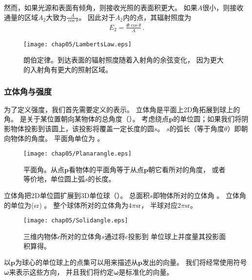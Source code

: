 然而，如果光源和表面有倾角，则接收光照的表面积更大。
如果$A$很小，则接收通量的区域$A_2$大致为$\displaystyle\frac{A}{\cos\theta}$。
因此对于$A_2$内的点，其辐射照度为
\begin{align*}
    E_2=\frac{\varPhi\cos\theta}{A}\, .
\end{align*}

\begin{figure}[htbp]
    \centering\texttt{[image: chap05/LambertsLaw.eps]}
    \caption{朗伯定律。到达表面的辐射照度随着入射角的余弦变化，
        因为更大的入射角有更大的照射区域。}
    \label{fig:5.7}
\end{figure}

\subsubsection*{立体角与强度}
为了定义强度，我们首先需要定义的表示。
立体角是平面上2D角拓展到球上的角。
是关于某位置朝向某物体的总角度（）。
考虑绕点$\bm p$的单位圆；如果我们将阴影物体投影到该圆上，该投影将覆盖一定长度的圆$s$。
$s$的弧长（等于角度$\theta$）即朝向物体的角度。
平面角单位为
。
\begin{figure}[htbp]
    \centering\texttt{[image: chap05/Planarangle.eps]}
    \caption{平面角。从点$\bm p$看物体的平面角等于从点$\bm p$朝它看所对的角度，
        或者等价地，单位圆上弧$s$的长度。}
    \label{fig:5.8}
\end{figure}

立体角把2D单位圆扩展到3D单位球（）。
总面积$s$即物体所对的立体角
。
立体角的单位为(sr)
。
整个球体所对的立体角为$4\pi \text{sr}$，
半球对应$2\pi \text{sr}$。
\begin{figure}[htbp]
    \centering\texttt{[image: chap05/Solidangle.eps]}
    \caption{三维内物体$c$所对的立体角$s$通过将$c$投影到
        单位球上并度量其投影面积算得。}
    \label{fig:5.9}
\end{figure}

以$\bm p$为球心的单位球上的点集可以用来描述从$\bm p$发出的向量。
我们将经常使用符号$\bm\omega$来表示这些方向，
并且我们将约定$\bm\omega$是标准化的向量。

